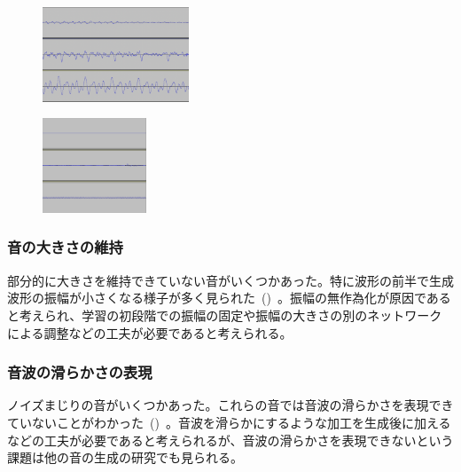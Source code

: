 \clearpage

\begin{figure}[t]
\centering
\begin{minipage}[b]{0.48\columnwidth}
\centering
\includegraphics[height=80pt]{figure/88_88_det/a0_0800_1000.png}
\label{fig:88_88_reduce1}
\end{minipage}
\begin{minipage}[b]{0.48\columnwidth}
\centering
\includegraphics[height=80pt]{figure/88_88_det/b7_0980_1000.png}
\label{fig:88_88_reduce2}
\end{minipage}
\caption[課題：音の減衰の表現]{}
\end{figure}

\subsubsection{音の大きさの維持}

部分的に大きさを維持できていない音がいくつかあった。特に波形の前半で生成波形の振幅が小さくなる様子が多く見られた~()~。振幅の無作為化が原因であると考えられ、学習の初段階での振幅の固定や振幅の大きさの別のネットワークによる調整などの工夫が必要であると考えられる。
    
\subsubsection{音波の滑らかさの表現}

ノイズまじりの音がいくつかあった。これらの音では音波の滑らかさを表現できていないことがわかった~()~。音波を滑らかにするような加工を生成後に加えるなどの工夫が必要であると考えられるが、音波の滑らかさを表現できないという課題は他の音の生成の研究でも見られる。

